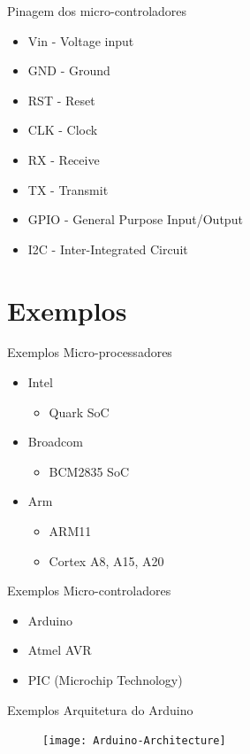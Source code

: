 \documentclass[t]{beamer}
\begin{document}
\begin{frame}{Pinagem dos micro-controladores}
\begin{itemize}
\item Vin - Voltage input
\item GND - Ground
\item RST - Reset
\item CLK - Clock
\item RX - Receive
\item TX - Transmit
\item GPIO - General Purpose Input/Output
\item I2C - Inter-Integrated Circuit
\end{itemize}
\end{frame}

\section{Exemplos}

\begin{frame}{Exemplos}
Micro-processadores
\begin{itemize}
\item Intel
\begin{itemize}
\item Quark SoC
\end{itemize}
\item Broadcom
\begin{itemize}
\item BCM2835 SoC
\end{itemize}
\item Arm
\begin{itemize}
\item ARM11
\item Cortex A8, A15, A20
\end{itemize}
\end{itemize}
\end{frame}

\begin{frame}{Exemplos}
Micro-controladores
\begin{itemize}
\item Arduino
\item Atmel AVR
\item PIC (Microchip Technology)
\end{itemize}
\end{frame}

\begin{frame}{Exemplos}
Arquitetura do Arduino
\begin{figure}
\texttt{[image: Arduino-Architecture]}
\end{figure}
\end{frame}
\end{document}
